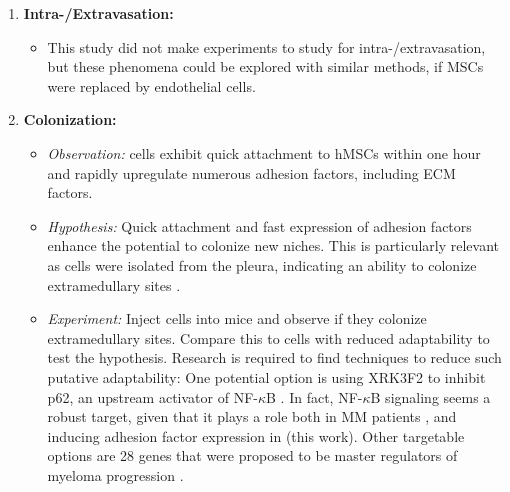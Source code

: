 \begin{enumerate}
\begin{itemize}
            \end{itemize}
      \item \textbf{Intra-/Extravasation:}
            \begin{itemize}
                  \item This study did not make experiments to study for
                        intra-/extravasation, but these phenomena could be
                        explored with similar methods, if MSCs were replaced by
                        endothelial cells.
            \end{itemize}
      \item \textbf{Colonization:}
            \begin{itemize}
                  \item \textit{Observation:} \INA cells exhibit quick
                        attachment to \acp{hMSC} within one hour and rapidly
                        upregulate numerous adhesion factors, including \ac{ECM}
                        factors.
                  \item \textit{Hypothesis:} Quick attachment and fast
                        expression of adhesion factors enhance the potential to
                        colonize new niches. This is particularly relevant as \INA
                        cells were isolated from the pleura, indicating an ability to
                        colonize extramedullary sites
                        \cite{burgerGp130RasMediated2001c}.
                  \item \textit{Experiment:} Inject \INA cells into mice and
                        observe if they colonize extramedullary sites. Compare
                        this to \INA cells with reduced adaptability to test the
                        hypothesis. Research is required to find techniques to
                        reduce such putative adaptability: One potential option
                        is using XRK3F2 to inhibit p62, an upstream activator of
                        NF-$\kappa$B \cite{adamikXRK3F2InhibitionP62ZZ2018}. In
                        fact, NF-$\kappa$B signaling seems a robust target,
                        given that it plays a role both in MM patients
                        \cite{sarinEvaluatingEfficacyMultiple2020}, and inducing
                        adhesion factor expression in \INA (this work).
                        Other targetable options are 28 genes that were proposed
                        to be master regulators of myeloma progression \cite{shenProgressionSignatureUnderlies2021}.



            \end{itemize}
\end{enumerate}


